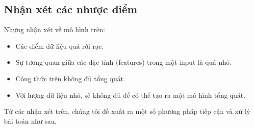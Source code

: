 \documentclass[12pt]{report}
\begin{document}
\subsection{Nhận xét các nhược điểm} %
\label{sub:nhận_xét_các_nhược_điểm}
\begin{flushleft}
	Những nhận xét về mô hình trên:
	\begin{itemize}
		\item Các điểm dữ liệu quá rời rạc.

		\item Sự tương quan giữa các đặc tính (features) trong một input là quá nhỏ.

		\item Công thức trên không đủ tổng quát.

		\item Với lượng dữ liệu nhỏ, sẽ không đủ để có thể tạo ra một mô hình tổng quát.
	\end{itemize}

	Từ các nhận xét trên, chúng tôi đề xuất ra một số phương pháp tiếp cận và xử lý bài toán như sau.
\end{flushleft}
\end{document}
